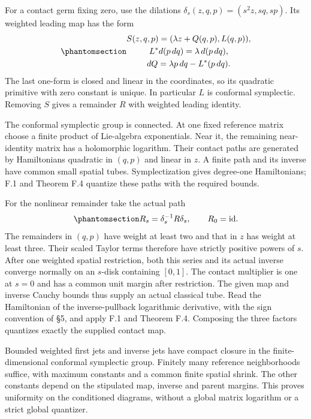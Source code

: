 \documentclass[
  english,
  11pt,
  reqno]{amsart}
\begin{document}
For a contact germ fixing zero, use the dilations
\(\delta_s(z,q,p)=(s^2z,sq,sp)\). Its weighted leading map has the form
\begin{equation}\protect\phantomsection\label{eq:gg-qct-weighted-leading}{\begin{gathered}
S(z,q,p)=(\lambda z+Q(q,p),L(q,p)), \\
L^*d(p\,dq)=\lambda\,d(p\,dq), \\
dQ=\lambda p\,dq-L^*(p\,dq).
\end{gathered}}\end{equation} The last one-form is closed and linear in the
coordinates, so its quadratic primitive with zero constant is unique. In
particular \(L\) is conformal symplectic. Removing \(S\) gives a
remainder \(R\) with weighted leading identity.

The conformal symplectic group is connected. At one fixed reference
matrix choose a finite product of Lie-algebra exponentials. Near it, the
remaining near-identity matrix has a holomorphic logarithm. Their
contact paths are generated by Hamiltonians quadratic in \((q,p)\) and
linear in \(z\). A finite path and its inverse have common small spatial
tubes. Symplectization gives degree-one Hamiltonians; F.1 and Theorem
F.4 quantize these paths with the required bounds.

For the nonlinear remainder take the actual path
\begin{equation}\protect\phantomsection\label{eq:gg-qct-weighted-path}{
 R_s=\delta_s^{-1}R\delta_s,\qquad R_0=\mathrm{id}.
}\end{equation} The remainders in \((q,p)\) have weight at least two and
that in \(z\) has weight at least three. Their scaled Taylor terms
therefore have strictly positive powers of \(s\). After one weighted
spatial restriction, both this series and its actual inverse converge
normally on an \(s\)-disk containing \([0,1]\). The contact multiplier
is one at \(s=0\) and has a common unit margin after restriction. The
given map and inverse Cauchy bounds thus supply an actual classical
tube. Read the Hamiltonian of the inverse-pullback logarithmic
derivative, with the sign convention of §5, and apply F.1 and Theorem
F.4. Composing the three factors quantizes exactly the supplied contact
map.

Bounded weighted first jets and inverse jets have compact closure in the
finite-dimensional conformal symplectic group. Finitely many reference
neighborhoods suffice, with maximum constants and a common finite
spatial shrink. The other constants depend on the stipulated map,
inverse and parent margins. This proves uniformity on the conditioned
diagrams, without a global matrix logarithm or a strict global
quantizer.
\end{document}
